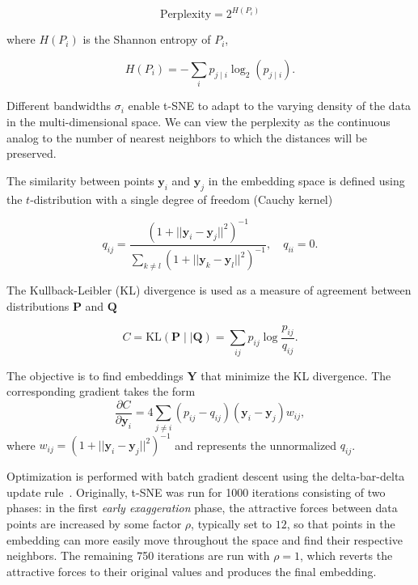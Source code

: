 \documentclass[letter]{article}
\begin{document}
\begin{equation}
\text{Perplexity} = 2^{H(P_i)}
\end{equation}

\noindent where $H(P_i)$ is the Shannon entropy of $P_i$,

\begin{equation}
H(P_i) = -\sum_i p_{j \mid i} \log_2 (p_{j \mid i}).
\end{equation}

\noindent Different bandwidths $\sigma_i$ enable t-SNE to adapt to the varying density of the data in the multi-dimensional space. We can view the perplexity as the continuous analog to the number of nearest neighbors to which the distances will be preserved. 

The similarity between points $\mathbf{y}_i$ and $\mathbf{y}_j$ in the embedding space is defined using the $t$-distribution with a single degree of freedom (Cauchy kernel)

\begin{equation}
q_{ij} = \frac{\left ( 1 + || \mathbf{y}_i - \mathbf{y}_j ||^2 \right )^{-1}}
{\sum_{k \neq l}\left ( 1 + || \mathbf{y}_k - \mathbf{y}_l ||^2 \right )^{-1}},
\quad q_{ii} = 0.
\label{eq:cauchy_kernel}
\end{equation}

The Kullback-Leibler (KL) divergence is used as a measure of agreement
between distributions $\mathbf{P}$ and $\mathbf{Q}$

\begin{equation}
C = \text{KL}(\mathbf{P} \mid \mid \mathbf{Q}) = \sum_{ij} p_{ij} \log \frac{p_{ij}}{q_{ij}}.
\label{eq:kl_divergence}
\end{equation}

\noindent The objective is to find embeddings $\mathbf{Y}$ that minimize the KL divergence. The corresponding gradient takes the form
\begin{equation}
\frac{\partial C}{\partial \mathbf{y}_i} = 4 \sum_{j \neq i} \left ( p_{ij} - q_{ij} \right ) \left ( \mathbf{y}_i - \mathbf{y}_j \right ) w_{ij},
\label{eq:tsne_gradient}
\end{equation}
where $w_{ij} = \left ( 1 + || \mathbf{y}_i - \mathbf{y}_j || ^2 \right )^{-1}$
and represents the unnormalized $q_{ij}$.

Optimization is performed with batch gradient descent using the delta-bar-delta update rule~\cite{jacobs1988increased}. Originally, t-SNE was run for 1000 iterations consisting of two phases: in the first \textit{early exaggeration} phase, the attractive forces between data points are increased by some factor $\rho$, typically set to $12$, so that points in the embedding can more easily move throughout the space and find their respective neighbors. The remaining 750 iterations are run with $\rho=1$, which reverts the attractive forces to their
original values and produces the final embedding.
\end{document}
